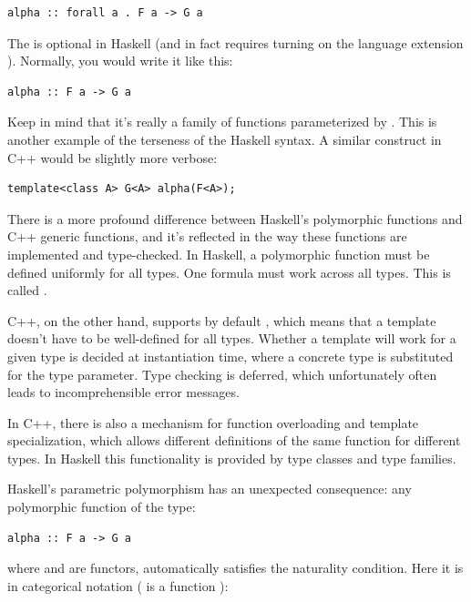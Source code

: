 \begin{Verbatim}[commandchars=\\\{\}]
alpha :: forall a . F a -> G a
\end{Verbatim}
The  is optional in Haskell (and in fact requires
turning on the language extension ). Normally,
you would write it like this:

\begin{Verbatim}[commandchars=\\\{\}]
alpha :: F a -> G a
\end{Verbatim}
Keep in mind that it's really a family of functions parameterized by
. This is another example of the terseness of the Haskell
syntax. A similar construct in C++ would be slightly more verbose:

\begin{Verbatim}
template<class A> G<A> alpha(F<A>);
\end{Verbatim}
There is a more profound difference between Haskell's polymorphic
functions and C++ generic functions, and it's reflected in the way these
functions are implemented and type-checked. In Haskell, a polymorphic
function must be defined uniformly for all types. One formula must work
across all types. This is called .

C++, on the other hand, supports by default ,
which means that a template doesn't have to be well-defined for all
types. Whether a template will work for a given type is decided at
instantiation time, where a concrete type is substituted for the type
parameter. Type checking is deferred, which unfortunately often leads to
incomprehensible error messages.

In C++, there is also a mechanism for function overloading and template
specialization, which allows different definitions of the same function
for different types. In Haskell this functionality is provided by type
classes and type families.

Haskell's parametric polymorphism has an unexpected consequence: any
polymorphic function of the type:

\begin{Verbatim}[commandchars=\\\{\}]
alpha :: F a -> G a
\end{Verbatim}
where  and  are functors, automatically satisfies
the naturality condition. Here it is in categorical notation (
is a function ):

